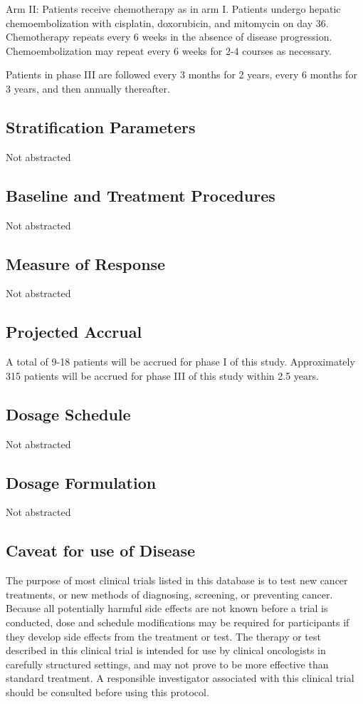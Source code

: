 \documentclass[12pt]{article}
\newcounter{qC}
\begin{document}
Arm II:  Patients receive chemotherapy as in arm I.  Patients undergo hepatic
chemoembolization with cisplatin, doxorubicin, and mitomycin on day 36.
Chemotherapy repeats every 6 weeks in the absence of disease progression.
Chemoembolization may repeat every 6 weeks for 2-4 courses as necessary.
                                     
                                     
Patients in phase III are followed every 3 months for 2 years, every 6 months
for 3 years, and then annually thereafter.

\setcounter{qC}{0}
\subsection*{Stratification Parameters}
Not abstracted

\setcounter{qC}{0}
\subsection*{Baseline and Treatment Procedures}
Not abstracted

\setcounter{qC}{0}
\subsection*{Measure of Response}
Not abstracted

\setcounter{qC}{0}
\subsection*{Projected Accrual}
A total of 9-18 patients will be accrued for phase I of this study.
Approximately 315 patients will be accrued for phase III of this study within
2.5 years.

\setcounter{qC}{0}
\subsection*{Dosage Schedule}
    Not abstracted

\setcounter{qC}{0}
\subsection*{Dosage Formulation}
    Not abstracted

\setcounter{qC}{0}
\subsection*{Caveat for use of Disease}
The purpose of most clinical trials listed in this database is to test new
cancer treatments, or new methods of diagnosing, screening, or preventing
cancer.  Because all potentially harmful side effects are not known before a
trial is conducted, dose and schedule modifications may be required for
participants if they develop side effects from the treatment or test.  The
therapy or test described in this clinical trial is intended for use by clinical
oncologists in carefully structured settings, and may not prove to be more
effective than standard treatment.  A responsible investigator associated with
this clinical trial should be consulted before using this protocol.
\end{document}
